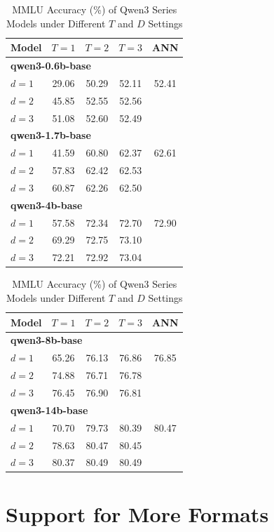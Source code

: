 \begin{table}[htbp!]
\centering
\caption{MMLU Accuracy (\%) of Qwen3 Series Models under Different $T$ and $D$ Settings}
\label{tab:appendix_qwen3_mmlu}
\small
\begin{tabular}[t]{lcccc}
\toprule
\textbf{Model} & $T{=}1$ & $T{=}2$ & $T{=}3$ & \textbf{ANN} \\
\midrule
\multicolumn{5}{l}{\textbf{qwen3-0.6b-base}} \\
$d{=}1$ & 29.06 & 50.29 & 52.11 & 52.41 \\
$d{=}2$ & 45.85 & 52.55 & 52.56 & \\
$d{=}3$ & 51.08 & 52.60 & 52.49 & \\
\midrule
\multicolumn{5}{l}{\textbf{qwen3-1.7b-base}} \\
$d{=}1$ & 41.59 & 60.80 & 62.37 & 62.61 \\
$d{=}2$ & 57.83 & 62.42 & 62.53 & \\
$d{=}3$ & 60.87 & 62.26 & 62.50 & \\
\midrule
\multicolumn{5}{l}{\textbf{qwen3-4b-base}} \\
$d{=}1$ & 57.58 & 72.34 & 72.70 & 72.90 \\
$d{=}2$ & 69.29 & 72.75 & 73.10 & \\
$d{=}3$ & 72.21 & 72.92 & 73.04 & \\
\bottomrule
\end{tabular}
\hspace{2.5em}
\begin{tabular}[t]{lcccc}
\toprule
\textbf{Model} & $T{=}1$ & $T{=}2$ & $T{=}3$ & \textbf{ANN} \\
\midrule
\multicolumn{5}{l}{\textbf{qwen3-8b-base}} \\
$d{=}1$ & 65.26 & 76.13 & 76.86 & 76.85 \\
$d{=}2$ & 74.88 & 76.71 & 76.78 & \\
$d{=}3$ & 76.45 & 76.90 & 76.81 & \\
\midrule
\multicolumn{5}{l}{\textbf{qwen3-14b-base}} \\
$d{=}1$ & 70.70 & 79.73 & 80.39 & 80.47 \\
$d{=}2$ & 78.63 & 80.47 & 80.45 & \\
$d{=}3$ & 80.37 & 80.49 & 80.49 & \\
\bottomrule
\end{tabular}
\end{table}

\section{Support for More Formats\label{sec:fp8_int4}}

